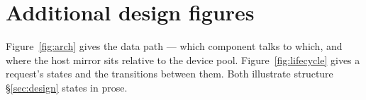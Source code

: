 
\section{Additional design figures}
\label{app:figures}

Figure~\ref{fig:arch} gives the data path --- which component talks to which,
and where the host mirror sits relative to the device pool.
Figure~\ref{fig:lifecycle} gives a request's states and the transitions between
them. Both illustrate structure \S\ref{sec:design} states in prose.

